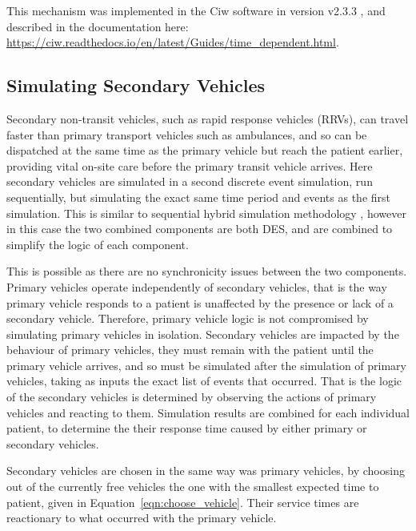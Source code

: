\documentclass[preprint,12pt]{elsarticle}
\begin{document}
This mechanism was implemented in the Ciw software in version v2.3.3
\cite{ciw233}, and described in the documentation here:
\url{https://ciw.readthedocs.io/en/latest/Guides/time_dependent.html}.

\subsection{Simulating Secondary Vehicles}\label{sec:simulation_secondary}
Secondary non-transit vehicles, such as rapid response vehicles (RRVs), can
travel faster than primary transport vehicles such as ambulances, and so can be
dispatched at the same time as the primary vehicle but reach the patient
earlier, providing vital on-site care before the primary transit vehicle
arrives.  Here secondary vehicles are simulated in a second discrete event
simulation, run sequentially, but simulating the exact same time period and
events as the first simulation. This is similar to sequential hybrid simulation
methodology \cite{brailsfordetal19, morganetal17}, however in this case the two
combined components are both DES, and are combined to simplify the logic of each
component.

This is possible as there are no synchronicity issues between the two
components.  Primary vehicles operate independently of secondary vehicles, that
is the way primary vehicle responds to a patient is unaffected by the presence
or lack of a secondary vehicle.  Therefore, primary vehicle logic is not
compromised by simulating primary vehicles in isolation.  Secondary vehicles are
impacted by the behaviour of primary vehicles, they must remain with the patient
until the primary vehicle arrives, and so must be simulated after the simulation
of primary vehicles, taking as inputs the exact list of events that occurred.
That is the logic of the secondary vehicles is determined by observing the
actions of primary vehicles and reacting to them.  Simulation results are
combined for each individual patient, to determine the their response time
caused by either primary or secondary vehicles.

Secondary vehicles are chosen in the same way was primary vehicles, by choosing
out of the currently free vehicles the one with the smallest expected time to
patient, given in Equation~\ref{eqn:choose_vehicle}. Their service times are
reactionary to what occurred with the primary vehicle.
\end{document}

